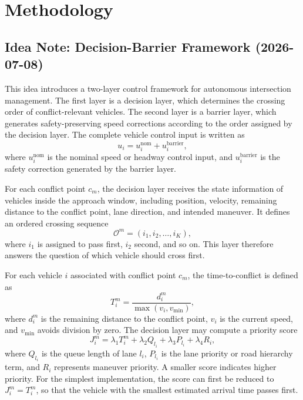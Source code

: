 \documentclass[conference]{IEEEtran}
\begin{document}
\section{Methodology}

\begingroup
\color{red}
\subsection{Idea Note: Decision-Barrier Framework (2026-07-08)}
This idea introduces a two-layer control framework for autonomous intersection management. The first layer is a decision layer, which determines the crossing order of conflict-relevant vehicles. The second layer is a barrier layer, which generates safety-preserving speed corrections according to the order assigned by the decision layer. The complete vehicle control input is written as
\begin{equation}
u_i = u_i^{\text{nom}} + u_i^{\text{barrier}},
\end{equation}
where $u_i^{\text{nom}}$ is the nominal speed or headway control input, and $u_i^{\text{barrier}}$ is the safety correction generated by the barrier layer.

For each conflict point $c_m$, the decision layer receives the state information of vehicles inside the approach window, including position, velocity, remaining distance to the conflict point, lane direction, and intended maneuver. It defines an ordered crossing sequence
\begin{equation}
\mathcal{O}^m = (i_1,i_2,\ldots,i_K),
\end{equation}
where $i_1$ is assigned to pass first, $i_2$ second, and so on. This layer therefore answers the question of which vehicle should cross first.

For each vehicle $i$ associated with conflict point $c_m$, the time-to-conflict is defined as
\begin{equation}
T_i^m = \frac{d_i^m}{\max(v_i,v_{\min})},
\end{equation}
where $d_i^m$ is the remaining distance to the conflict point, $v_i$ is the current speed, and $v_{\min}$ avoids division by zero. The decision layer may compute a priority score
\begin{equation}
J_i^m = \lambda_1 T_i^m + \lambda_2 Q_{l_i} + \lambda_3 P_{l_i} + \lambda_4 R_i,
\end{equation}
where $Q_{l_i}$ is the queue length of lane $l_i$, $P_{l_i}$ is the lane priority or road hierarchy term, and $R_i$ represents maneuver priority. A smaller score indicates higher priority. For the simplest implementation, the score can first be reduced to $J_i^m=T_i^m$, so that the vehicle with the smallest estimated arrival time passes first.
\end{document}
